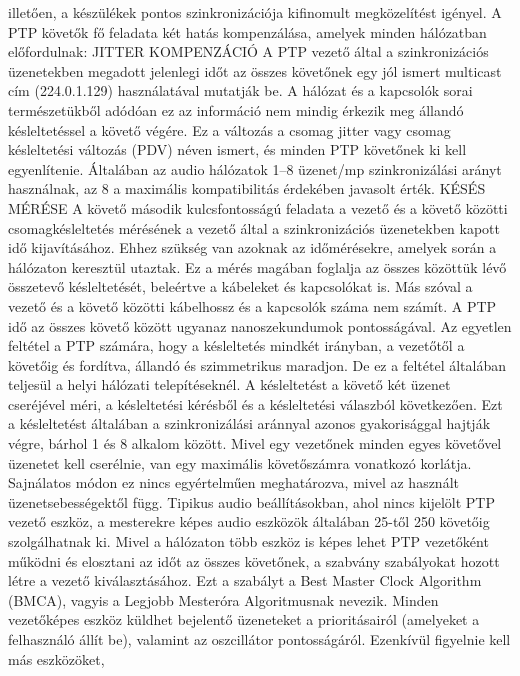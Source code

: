 illetően, a készülékek pontos szinkronizációja kifinomult megközelítést igényel.
A PTP követők fő feladata két hatás kompenzálása, amelyek minden hálózatban
előfordulnak: JITTER KOMPENZÁCIÓ A PTP vezető által a szinkronizációs
üzenetekben megadott jelenlegi időt az összes követőnek egy jól ismert multicast
cím (224.0.1.129) használatával mutatják be. A hálózat és a kapcsolók sorai
természetükből adódóan ez az információ nem mindig érkezik meg állandó
késleltetéssel a követő végére. Ez a változás a csomag jitter vagy csomag
késleltetési változás (PDV) néven ismert, és minden PTP követőnek ki kell
egyenlítenie. Általában az audio hálózatok 1--8 üzenet/mp szinkronizálási arányt
használnak, az 8 a maximális kompatibilitás érdekében javasolt érték. KÉSÉS
MÉRÉSE A követő második kulcsfontosságú feladata a vezető és a követő közötti
csomagkésleltetés mérésének a vezető által a szinkronizációs üzenetekben kapott
idő kijavításához. Ehhez szükség van azoknak az időmérésekre, amelyek során a
hálózaton keresztül utaztak. Ez a mérés magában foglalja az összes közöttük lévő
összetevő késleltetését, beleértve a kábeleket és kapcsolókat is. Más szóval a
vezető és a követő közötti kábelhossz és a kapcsolók száma nem számít. A PTP idő
az összes követő között ugyanaz nanoszekundumok pontosságával. Az egyetlen
feltétel a PTP számára, hogy a késleltetés mindkét irányban, a vezetőtől a
követőig és fordítva, állandó és szimmetrikus maradjon. De ez a feltétel
általában teljesül a helyi hálózati telepítéseknél. A késleltetést a követő két
üzenet cseréjével méri, a késleltetési kérésből és a késleltetési válaszból
következően. Ezt a késleltetést általában a szinkronizálási aránnyal azonos
gyakorisággal hajtják végre, bárhol 1 és 8 alkalom között. Mivel egy vezetőnek
minden egyes követővel üzenetet kell cserélnie, van egy maximális követőszámra
vonatkozó korlátja. Sajnálatos módon ez nincs egyértelműen meghatározva, mivel
az használt üzenetsebességektől függ. Tipikus audio beállításokban, ahol nincs
kijelölt PTP vezető eszköz, a mesterekre képes audio eszközök általában 25-től
250 követőig szolgálhatnak ki.
Mivel a hálózaton több eszköz is képes lehet PTP vezetőként működni és elosztani
az időt az összes követőnek, a szabvány szabályokat hozott létre a vezető
kiválasztásához. Ezt a szabályt a Best Master Clock Algorithm (BMCA), vagyis a
Legjobb Mesteróra Algoritmusnak nevezik. Minden vezetőképes eszköz küldhet
bejelentő üzeneteket a prioritásairól (amelyeket a felhasználó állít be),
valamint az oszcillátor pontosságáról. Ezenkívül figyelnie kell más eszközöket,
